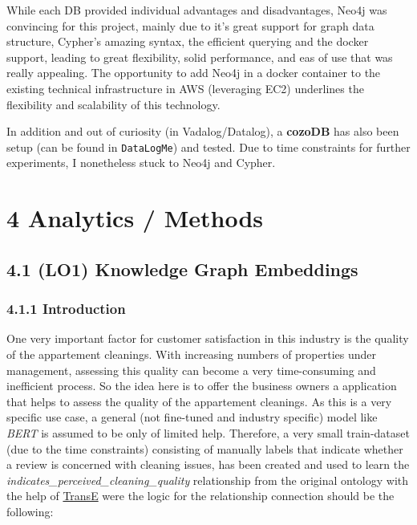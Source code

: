 \documentclass[
]{article}
\begin{document}
While each DB provided individual advantages and disadvantages, Neo4j
was convincing for this project, mainly due to it's great support for
graph data structure, Cypher's amazing syntax, the efficient querying
and the docker support, leading to great flexibility, solid performance,
and eas of use that was really appealing. The opportunity to add Neo4j
in a docker container to the existing technical infrastructure in AWS
(leveraging EC2) underlines the flexibility and scalability of this
technology.

In addition and out of curiosity (in Vadalog/Datalog), a \textbf{cozoDB}
has also been setup (can be found in \texttt{DataLogMe}) and tested. Due
to time constraints for further experiments, I nonetheless stuck to
Neo4j and Cypher.

\pagebreak

\section{4 Analytics / Methods}\label{analytics-methods}

\subsection{4.1 (LO1) Knowledge Graph
Embeddings}\label{knowledge-graph-embeddings}

\subsubsection{4.1.1 Introduction}\label{introduction-1}

One very important factor for customer satisfaction in this industry is
the quality of the appartement cleanings. With increasing numbers of
properties under management, assessing this quality can become a very
time-consuming and inefficient process. So the idea here is to offer the
business owners a application that helps to assess the quality of the
appartement cleanings. As this is a very specific use case, a general
(not fine-tuned and industry specific) model like \textit{BERT} is assumed to be
only of limited help. Therefore, a very small train-dataset (due to the
time constraints) consisting of manually labels that indicate whether a
review is concerned with cleaning issues, has been created and used to
learn the \emph{indicates\_perceived\_cleaning\_quality} relationship
from the original ontology with the help of
\href{https://proceedings.neurips.cc/paper_files/paper/2013/file/1cecc7a77928ca8133fa24680a88d2f9-Paper.pdf}{TransE}
were the logic for the relationship connection should be the following:
\end{document}
